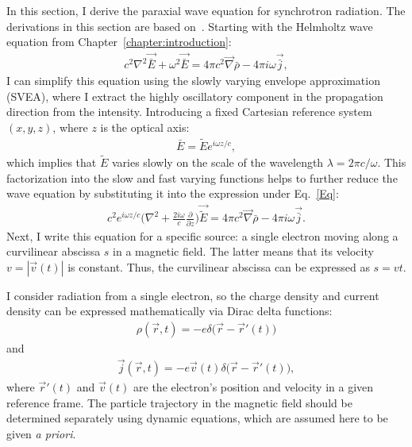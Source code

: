     In this section, I derive the paraxial wave equation for synchrotron radiation. The derivations in this section are based on~\cite{geloni_paraxial_2005}. Starting with the Helmholtz wave equation from Chapter~\ref{chapter:introduction}:
    \begin{align}
        c^2 \nabla^2 \vec{\bar{E}} + \omega^2 \vec{\bar{E}} = 4 \pi c^2 \vec{\nabla} \bar{\rho} - 4 \pi i \omega \vec{\bar{j}},
        \label{Eq}
    \end{align}
    I can simplify this equation using the slowly varying envelope approximation (SVEA), where I extract the highly oscillatory component in the propagation direction from the intensity. Introducing a fixed Cartesian reference system $(x,y,z)$, where $z$ is the optical axis:
    \begin{align}
        \bar{E} = \tilde{E}e^{i \omega z / c},
    \end{align}
    which implies that $\tilde{E}$ varies slowly on the scale of the wavelength $\lambda = 2 \pi c / \omega$. This factorization into the slow and fast varying functions helps to further reduce the wave equation by substituting it into the expression under Eq.~\ref{Eq}:
    \begin{align}
        c^2 e^{i \omega z / c} \bigg( \nabla^2 + \frac{2 i \omega}{c} \frac{\partial }{\partial z} \bigg)\vec{\tilde{E}} = 4 \pi c^2 \vec{\nabla} \bar{\rho} - 4 \pi i \omega \vec{\bar{j}}.
        \label{Eq}
    \end{align}
    Next, I write this equation for a specific source: a single electron moving along a curvilinear abscissa $s$ in a magnetic field. The latter means that its velocity $v = |\vec{v}(t)|$ is constant. Thus, the curvilinear abscissa can be expressed as $s = vt$.
    
    I consider radiation from a single electron, so the charge density and current density can be expressed mathematically via Dirac delta functions:
    \begin{align}
        \rho(\vec{r}, t) = -e\delta\big(\vec{r} - \vec{r}'(t)\big)  
        \label{Eq:rho}
    \end{align}
    and
    \begin{align}
        \vec{j}(\vec{r}, t) = -e\vec{v}(t)\delta\big(\vec{r} - \vec{r}'(t)\big),
        \label{Eq:j}
    \end{align}
    where $\vec{r}'(t)$ and $\vec{v}(t)$ are the electron's position and velocity in a given reference frame. The particle trajectory in the magnetic field should be determined separately using dynamic equations, which are assumed here to be given \textit{a priori}.
    
